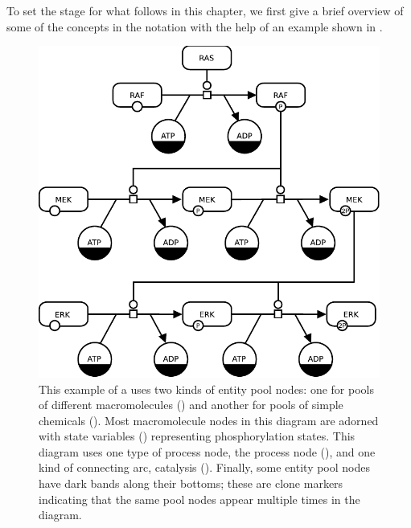 
To set the stage for what follows in this chapter, we first give a brief overview of some of the concepts in the \PD notation with the help of an example shown in .

\begin{figure}[H]
  \centering
  \vspace*{-0.75em}
  \includegraphics[scale=0.8]{examples/MAPK-only}
  \caption{This example of a \PD uses two kinds of entity pool nodes: one
    for pools of different macromolecules () and
    another for pools of simple chemicals ().  Most
    macromolecule nodes in this diagram are adorned with state
    variables () representing phosphorylation states.
    This diagram uses one type of process node, the process node
    (), and one kind of connecting arc, catalysis
    ().  Finally, some entity pool nodes have dark bands
    along their bottoms; these are clone markers indicating that the same
    pool nodes appear multiple times in the diagram.}
  \label{fig:eg1}
\end{figure}

